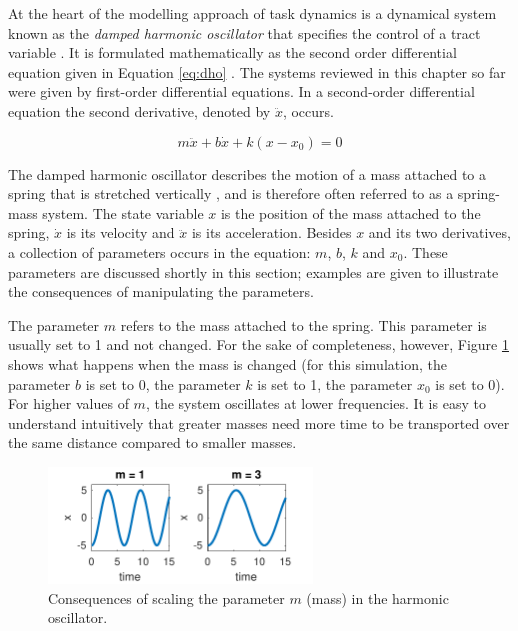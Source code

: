 At the heart of the modelling approach of task dynamics is a dynamical\largerpage{} system known as the \emph{damped harmonic oscillator} that specifies the control of a tract variable \citep{Hawkins1992}. It is formulated mathematically as the second order differential equation given in Equation \ref{eq:dho} \citep{SaltzmanKelso1987}. The systems reviewed in this chapter so far were given by first-order differential equations. In a second-order differential equation the second derivative, denoted by $\ddot{x}$, occurs.

\begin{equation}
m\ddot{x} + b\dot{x} + k(x-x_0) = 0
\label{eq:dho}
\end{equation}

The damped harmonic oscillator describes the motion of a mass attached to a spring that is stretched vertically \citep{FeynmanLeightonSands1963}, and is therefore often referred to as a spring-mass system. The state variable $x$ is the position of the mass attached to the spring, $\dot{x}$ is its velocity and $\ddot{x}$ is its acceleration. Besides $x$ and its two derivatives, a collection of parameters occurs in the equation: $m$, $b$, $k$ and $x_0$. These parameters are discussed shortly in this section; examples are given to illustrate the consequences of manipulating the parameters. 

The parameter $m$ refers to the mass attached to the spring. This parameter is usually set to 1 and not changed. For the sake of completeness, however, Figure \ref{fig:dho_mass}  shows what happens when the mass is changed (for this simulation, the parameter $b$ is set to 0, the parameter $k$ is set to 1, the parameter $x_0$ is set to 0). For higher values of $m$, the system oscillates at lower frequencies. It is easy to understand intuitively that greater masses need more time to be transported over the same distance compared to smaller masses. \newpage

\begin{figure}[t]
\includegraphics[width=7cm]{figures/ch3/dho_mass.pdf}
\caption{Consequences of scaling the parameter $m$ (mass) in the harmonic oscillator.}
\label{fig:dho_mass}
\end{figure}

